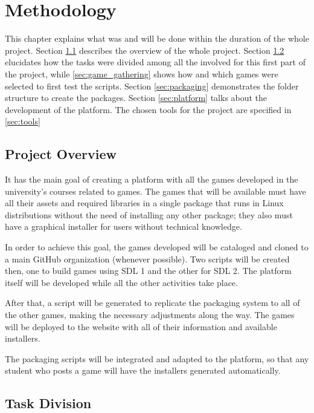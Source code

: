 \chapter{Methodology}
\label{sec:methodology}

This chapter explains what was and will be done within the duration of the whole project. Section \ref{sec:project_overview} describes the overview of the whole project. Section \ref{sec:task_division} elucidates how the tasks were divided among all the involved for this first part of the project, while  \ref{sec:game_gathering} shows how and which games were selected to first test the scripts. Section \ref{sec:packaging} demonstrates the folder structure to create the packages. Section \ref{sec:platform} talks about the development of the platform. The chosen tools for the project are specified in \ref{sec:tools}

\section{Project Overview}
\label{sec:project_overview}

It has the main goal of creating a platform with all the games developed in the university's courses related to games. The games that will be available must have all their assets and required libraries in a single package that runs in Linux distributions without the need of installing any other package; they also must have a graphical installer for users without technical knowledge.

In order to achieve this goal, the games developed will be cataloged and cloned to a main GitHub organization (whenever possible). Two scripts will be created then, one to build games using SDL 1 and the other for SDL 2. The platform itself will be developed while all the other activities take place.

After that, a script will be generated to replicate the packaging system to all of the other games, making the necessary adjustments along the way. The games will be deployed to the website with all of their information and available installers.

The packaging scripts will be integrated and adapted to the platform, so that any student who posts a game will have the installers generated automatically.

\section{Task Division}
\label{sec:task_division}

